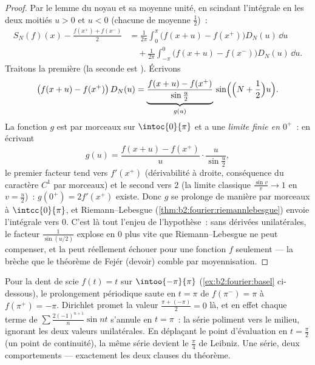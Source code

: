 \begin{proof}
Par le lemme du noyau et sa moyenne unité, en scindant l'intégrale en
les deux moitiés $u > 0$ et $u < 0$ (chacune de moyenne
$\frac12$)~:
\begin{align*}
S_N(f)(x) - \frac{f(x^+) + f(x^-)}{2}
&= \frac{1}{2\pi}\int_{0}^{\pi} \bigl(f(x+u) -
f(x^+)\bigr)D_N(u)\,\dd u\\
&\quad+ \frac{1}{2\pi}\int_{-\pi}^{0}\bigl(f(x+u) -
f(x^-)\bigr)D_N(u)\,\dd u .
\end{align*}
Traitons la première (la seconde est ). Écrivons
\[
\bigl(f(x + u) - f(x^+)\bigr)\,D_N(u)
= \underbrace{\frac{f(x+u) - f(x^+)}{\sin\frac u2}}_{g(u)}\,
\sin\Bigl(\Bigl(N + \frac12\Bigr)u\Bigr) .
\]
La fonction $g$ est  par morceaux sur $\intoc{0}{\pi}$ et a
une \emph{limite finie en $0^+$}~: en écrivant
\[
g(u) = \frac{f(x+u) - f(x^+)}{u}\cdot\frac{u}{\sin\frac u2} ,
\]
le premier facteur tend vers $f'(x^+)$ (dérivabilité à droite,
conséquence du caractère $C^1$ par morceaux) et le second vers $2$
(la limite classique $\frac{\sin v}{v} \to 1$ en $v = \frac
u2$)~: $g(0^+) = 2f'(x^+)$ existe. Donc $g$ se prolonge de manière
 par morceaux à $\intcc{0}{\pi}$, et Riemann--Lebesgue
(\cref{thm:b2:fourier:riemannlebesgue}) envoie l'intégrale vers
$0$. C'est là tout l'enjeu de l'hypothèse~: sans dérivées
unilatérales, le facteur $\frac{1}{\sin(u/2)}$ explose en $0$ plus
vite que Riemann--Lebesgue ne peut compenser, et la  peut réellement échouer pour une fonction $f$ seulement
 --- la brèche que le théorème de Fejér (devoir) comble par
moyennisation.
\end{proof}

\begin{example}\label{ex:b2:fourier:jumpvalue}
Pour la dent de scie $f(t) = t$ sur $\intoo{-\pi}{\pi}$
(\cref{ex:b2:fourier:basel} ci-dessous), le prolongement périodique
saute en $t = \pi$ de $f(\pi^-) = \pi$ à $f(\pi^+) = -\pi$.
Dirichlet promet la valeur $\frac{\pi + (-\pi)}{2} = 0$ là, et en
effet chaque terme de $\sum \frac{2(-1)^{n+1}}{n}\sin nt$ s'annule
en $t = \pi$~: la série  poliment vers le milieu, ignorant
les deux valeurs unilatérales. En déplaçant le point d'évaluation en
$t = \frac\pi2$ (un point de continuité), la même série devient le
$\frac\pi4$ de Leibniz. Une série, deux comportements --- exactement
les deux clauses du théorème.
\end{example}

